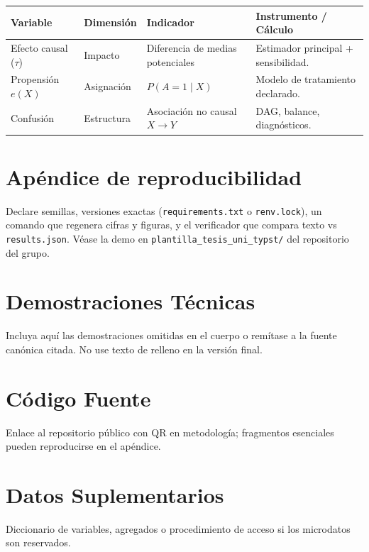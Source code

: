\documentclass[12pt,a4paper,oneside]{book}
\theoremstyle{plain}
\theoremstyle{definition}
\theoremstyle{remark}
\begin{document}
\begin{appendices}
\begin{longtable}{p{3.2cm} p{3.2cm} p{3.2cm} p{4.6cm}}
\toprule
\textbf{Variable} & \textbf{Dimensión} & \textbf{Indicador} & \textbf{Instrumento / Cálculo} \\
\midrule
Efecto causal ($\tau$) & Impacto & Diferencia de medias potenciales & Estimador principal + sensibilidad. \\
Propensión $e(X)$ & Asignación & $P(A=1\mid X)$ & Modelo de tratamiento declarado. \\
Confusión & Estructura & Asociación no causal $X \to Y$ & DAG, balance, diagnósticos. \\
\bottomrule
\end{longtable}

\chapter{Apéndice de reproducibilidad}
\noindent Declare semillas, versiones exactas (\texttt{requirements.txt} o \texttt{renv.lock}), un comando que regenera cifras y figuras, y el verificador que compara texto vs \texttt{results.json}. Véase la demo en \texttt{plantilla\_tesis\_uni\_typst/} del repositorio del grupo.

\chapter{Demostraciones Técnicas}
\noindent Incluya aquí las demostraciones omitidas en el cuerpo o remítase a la fuente canónica citada. No use texto de relleno en la versión final.

\chapter{Código Fuente}
\noindent Enlace al repositorio público con QR en metodología; fragmentos esenciales pueden reproducirse en el apéndice.

\chapter{Datos Suplementarios}
\noindent Diccionario de variables, agregados o procedimiento de acceso si los microdatos son reservados.

\end{appendices}
\end{document}
